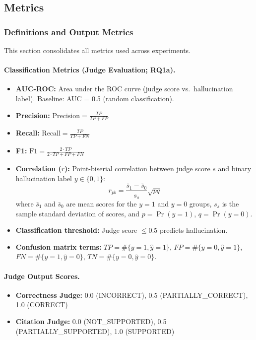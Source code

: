 \subsection{Metrics}

\subsubsection{Definitions and Output Metrics}
\label{sec:metrics_definitions}

This section consolidates all metrics used across experiments.

\paragraph{Classification Metrics (Judge Evaluation; RQ1a).}
\begin{itemize}[noitemsep]
    \item \textbf{AUC-ROC:} Area under the ROC curve (judge score vs.\ hallucination label). Baseline: AUC = 0.5 (random classification).
    \item \textbf{Precision:} $\mathrm{Precision}=\frac{TP}{TP+FP}$
    \item \textbf{Recall:} $\mathrm{Recall}=\frac{TP}{TP+FN}$
    \item \textbf{F1:} $\mathrm{F1}=\frac{2\cdot TP}{2\cdot TP+FP+FN}$
    \item \textbf{Correlation ($r$):} Point-biserial correlation between judge score $s$ and binary hallucination label $y\in\{0,1\}$:
    \begin{equation}
        r_{pb}=\frac{\bar{s}_1-\bar{s}_0}{s_s}\sqrt{pq}
    \end{equation}
    where $\bar{s}_1$ and $\bar{s}_0$ are mean scores for the $y{=}1$ and $y{=}0$ groups, $s_s$ is the sample standard deviation of scores, and $p=\Pr(y{=}1)$, $q=\Pr(y{=}0)$.
    \item \textbf{Classification threshold:} Judge score $\leq 0.5$ predicts hallucination.
    \item \textbf{Confusion matrix terms:} $TP=\#\{y{=}1,\hat{y}{=}1\}$, $FP=\#\{y{=}0,\hat{y}{=}1\}$, $FN=\#\{y{=}1,\hat{y}{=}0\}$, $TN=\#\{y{=}0,\hat{y}{=}0\}$.
\end{itemize}

\paragraph{Judge Output Scores.}
\begin{itemize}[noitemsep]
    \item \textbf{Correctness Judge:} 0.0 (INCORRECT), 0.5 (PARTIALLY\_CORRECT), 1.0 (CORRECT)
    \item \textbf{Citation Judge:} 0.0 (NOT\_SUPPORTED), 0.5 (PARTIALLY\_SUPPORTED), 1.0 (SUPPORTED)
\end{itemize}

